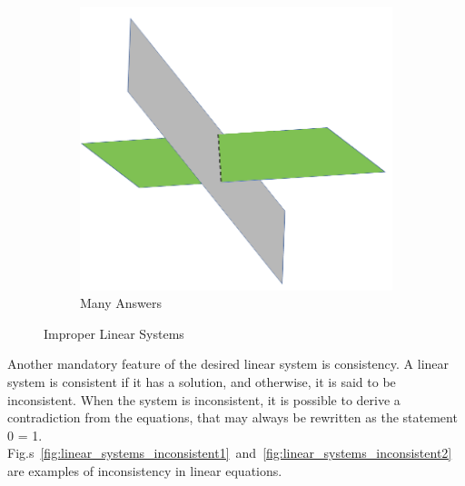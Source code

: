 \documentclass[10pt, journal, letterpaper]{IEEEtran}
\begin{document}
\begin{figure}[hbt!]
\begin{subfigure}{0.49\columnwidth}
          \includegraphics[width=\columnwidth]{img/Many_answer.png}
          \caption{Many Answers}
          \label{fig:linear_systems_many_answers}
    \end{subfigure}
    \caption{Improper Linear Systems}
    \label{fig:linear_systems}
\end{figure}
Another mandatory feature of the desired linear system is consistency. A linear system is consistent if it has a solution, and otherwise, it is said to be inconsistent. When the system is inconsistent, it is possible to derive a contradiction from the equations, that may always be rewritten as the statement 0 = 1. Fig.s~\ref{fig:linear_systems_inconsistent1}~and~\ref{fig:linear_systems_inconsistent2} are examples of inconsistency in linear equations. 
\end{document}
